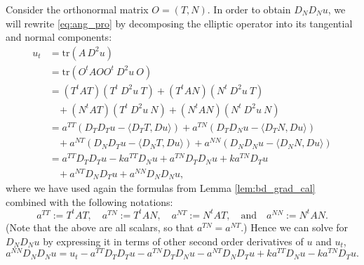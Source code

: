 \documentclass[12pt]{article}
\numberwithin{equation}{section}
\theoremstyle{plain}
\theoremstyle{definition}
\theoremstyle{remark}
\begin{document}
Consider the orthonormal matrix $O=(T,N)$. In order to obtain $D_N D_N u$, 
we will rewrite \eqref{eq:ang_pro} by decomposing the elliptic operator into its tangential and normal components:
\begin{equation} \label{eq:ang_ut_rew}
\begin{split}
    u_t & = \text{tr} \left( A\,D^2u \right) \\
        & = \text{tr} \left( O^t A O O^t \ D^2 u \ O  \right) \\
        & =  \left( T^t A T \right) \left( T^t \ D^2 u \  T \right) 
        +  \left( T^t A N \right) \left( N^t \ D^2 u \  T \right) \\
        & \ \ \ \  +  \left( N^t A T \right) \left( T^t \ D^2 u \ N \right) + \left( N^t A N \right) \left( N^t \ D^2 u \ N \right) \\
        & =  a^{T T} \left( D_{T} D_{T} u -\langle D_{T} T , Du \rangle   \right) +  a^{T N} \left( D_{T} D_{N} u -\langle D_{T} N , Du \rangle   \right) \\
        & \ \ \ \  +  a^{N T} \left( D_{N} D_{T} u -\langle D_{N} T , Du \rangle   \right) + a^{NN} \left( D_{N} D_{N} u -\langle D_{N} N , Du \rangle   \right) \\
        & =  a^{T T} D_{T} D_{T} u  - k a^{T T} D_N u +  a^{T N} D_{T} D_N u +  k a^{T N} D_{T} u \\
        & \ \ \ \  +  a^{N T} D_N D_{T} u + a^{NN} D_N D_N u,
\end{split}
\end{equation}
where we have used again the formulas from Lemma \ref{lem:bd_grad_cal}
combined with the following notations:
\begin{equation}\label{eq:att.2d}
a^{T T}  := T^t A T ,\quad
a^{T N}  := T^t A N ,\quad
a^{N T}  := N^t A T ,\quad\text{and}\quad
a^{NN}   := N^t A N.
\end{equation}
(Note that the above are all scalars, so that $a^{TN} = a^{NT}$.)
Hence we can solve for $D_N D_N u$ by expressing it in terms of other second order derivatives of $u$ and $u_t$,
\begin{equation} \label{eq:ang_NNu}
    a^{NN} D_N D_N u = u_t - a^{TT} D_T D_T u - a^{TN} D_T D_N u - a^{NT} D_N D_T u + k a^{TT} D_N u - k a^{TN} D_T u.
\end{equation}
\end{document}
